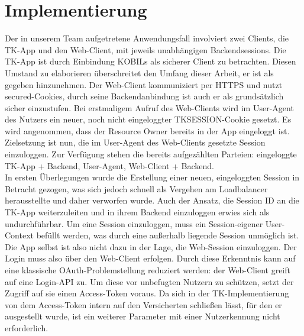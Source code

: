 \chapter{Implementierung}\label{Implementierung} Der in unserem Team
aufgetretene Anwendungsfall involviert zwei Clients, die TK-App und den
Web-Client, mit jeweils unabhängigen Backendsessions. Die TK-App ist durch
Einbindung KOBILs als sicherer Client zu betrachten. Diesen Umstand zu
elaborieren überschreitet den Umfang dieser Arbeit, er ist als gegeben
hinzunehmen. Der Web-Client kommuniziert per HTTPS und nutzt secured-Cookies,
durch seine Backendanbindung ist auch er als grundsätzlich sicher einzustufen.
Bei erstmaligem Aufruf des Web-Clients wird im User-Agent des Nutzers ein neuer,
noch nicht eingeloggter TKSESSION-Cookie gesetzt. Es wird angenommen, dass der
Resource Owner bereits in der App eingeloggt ist. Zielsetzung ist nun, die im
User-Agent des Web-Clients gesetzte Session einzuloggen. Zur Verfügung stehen
die bereits aufgezählten Parteien: eingeloggte TK-App + Backend, User-Agent,
Web-Client + Backend.
\\
In ersten Überlegungen wurde die Erstellung einer neuen, eingeloggten Session
in Betracht gezogen, was sich jedoch schnell als Vergehen am Loadbalancer
herausstellte und daher verworfen wurde. Auch der Ansatz, die Session ID an die
TK-App weiterzuleiten und in ihrem Backend einzuloggen erwies sich als
undurchführbar. Um eine Session einzuloggen, muss ein Session-eigener
User-Context befüllt werden, was durch eine außerhalb liegende Session unmöglich
ist.
\\
Die App selbst ist also nicht dazu in der Lage, die Web-Session einzuloggen.
Der Login muss also über den Web-Client erfolgen. Durch diese Erkenntnis kann
auf eine klassische \gls{OAuth}-Problemstellung reduziert werden: der Web-Client
greift auf eine Login-API zu. Um diese vor unbefugten Nutzern zu schützen, setzt
der Zugriff auf sie einen Access-Token voraus. Da sich in der TK-Implementierung
von dem Access-Token intern auf den Versicherten schließen lässt, für den er
ausgestellt wurde, ist ein weiterer Parameter mit einer Nutzerkennung nicht
erforderlich.

